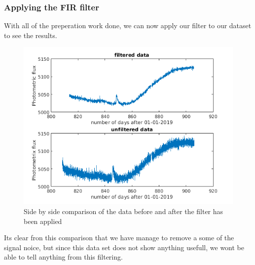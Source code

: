 \subsubsection{Applying the FIR filter}
With all of the preperation work done, we can now apply our filter to our dataset to see the results.

\begin{figure}[h]
  \centering
  \includegraphics[scale=0.62]{matlabStuff/datasetComparison.png}
  \caption{Side by side comparison of the data before and after the filter has been applied}%
  \label{fig:datasetComparison}
\end{figure}

Its clear fron this comparison that we have manage to remove a some of the signal noice, but since this data set does not show
anything usefull, we wont be able to tell anything from this filtering.


